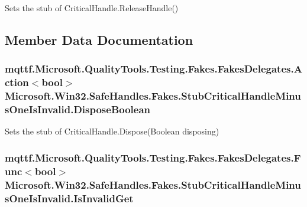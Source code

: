 Sets the stub of Critical\-Handle.\-Release\-Handle()



\subsection{Member Data Documentation}
\hypertarget{class_microsoft_1_1_win32_1_1_safe_handles_1_1_fakes_1_1_stub_critical_handle_minus_one_is_invalid_af040689143ebc33c0efa055b356bae22}{
\subsubsection[{Dispose\-Boolean}]{\setlength{\rightskip}{0pt plus 5cm}mqttf.\-Microsoft.\-Quality\-Tools.\-Testing.\-Fakes.\-Fakes\-Delegates.\-Action$<$bool$>$ Microsoft.\-Win32.\-Safe\-Handles.\-Fakes.\-Stub\-Critical\-Handle\-Minus\-One\-Is\-Invalid.\-Dispose\-Boolean}}\label{class_microsoft_1_1_win32_1_1_safe_handles_1_1_fakes_1_1_stub_critical_handle_minus_one_is_invalid_af040689143ebc33c0efa055b356bae22}


Sets the stub of Critical\-Handle.\-Dispose(\-Boolean disposing)

\hypertarget{class_microsoft_1_1_win32_1_1_safe_handles_1_1_fakes_1_1_stub_critical_handle_minus_one_is_invalid_a871df37df84fb84327f84e8e8fe8ba47}{
\subsubsection[{Is\-Invalid\-Get}]{\setlength{\rightskip}{0pt plus 5cm}mqttf.\-Microsoft.\-Quality\-Tools.\-Testing.\-Fakes.\-Fakes\-Delegates.\-Func$<$bool$>$ Microsoft.\-Win32.\-Safe\-Handles.\-Fakes.\-Stub\-Critical\-Handle\-Minus\-One\-Is\-Invalid.\-Is\-Invalid\-Get}}\label{class_microsoft_1_1_win32_1_1_safe_handles_1_1_fakes_1_1_stub_critical_handle_minus_one_is_invalid_a871df37df84fb84327f84e8e8fe8ba47}


